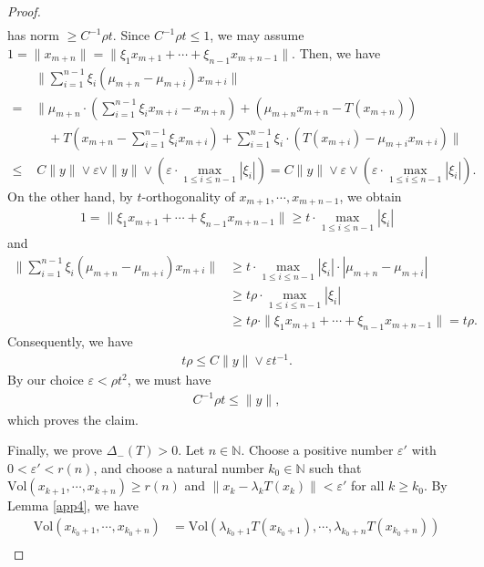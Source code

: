 \documentclass[12pt]{amsart}
\theoremstyle{plain}
\theoremstyle{definition}
\begin{document}
\begin{proof}
\begin{align*}
  \end{align*}
has norm $\ge C^{-1} \rho t$. Since $C^{-1} \rho t \le 1$, we may assume $1 = \|x_{m+n}\| = \|\xi_1 x_{m+1} + \cdots + \xi_{n-1}x_{m+n-1}\|$. Then, we have
\begin{align*}
  & \|\sum_{i=1}^{n-1}\xi_i(\mu_{m+n} - \mu_{m+i})x_{m+i}\| \\
  = \, & \|\mu_{m+n} \cdot (\sum_{i=1}^{n-1}\xi_ix_{m+i} - x_{m+n}) + (\mu_{m+n}x_{m+n} - T(x_{m+n}))  \\ 
  & \quad + T(x_{m+n} - \sum_{i=1}^{n-1}\xi_i x_{m+i}) + \sum_{i=1}^{n-1}\xi_i \cdot (T(x_{m+i}) - \mu_{m+i}x_{m+i})\| \\
  \le & \, C\|y\| \lor \varepsilon \lor \|y\| \lor (\varepsilon \cdot \max_{1\le i \le n-1} |\xi_i|) = C \|y\| \lor \varepsilon \lor (\varepsilon \cdot \max_{1\le i \le n-1} |\xi_i|).
\end{align*}
On the other hand, by $t$-orthogonality of $x_{m+1}, \cdots, x_{m+n-1}$, we obtain
  \begin{align*}
    1 = \|\xi_1 x_{m+1} + \cdots + \xi_{n-1}x_{m+n-1}\| \ge t \cdot \max_{1\le i \le n-1} |\xi_i|
  \end{align*}
  and
\begin{align*}
  \|\sum_{i=1}^{n-1}\xi_i(\mu_{m+n} - \mu_{m+i})x_{m+i}\| &\ge t \cdot \max_{1\le i \le n-1} |\xi_i| \cdot |\mu_{m+n} - \mu_{m+i}| \\
  & \ge t \rho \cdot  \max_{1\le i \le n-1} |\xi_i| \\
  &\ge t \rho \cdot \|\xi_1 x_{m+1} + \cdots + \xi_{n-1}x_{m+n-1}\| = t \rho.
\end{align*}
Consequently, we have
  \begin{align*}
    t \rho \le C \|y\| \lor \varepsilon t^{-1}.
  \end{align*}
  By our choice $\varepsilon < \rho t^2$, we must have 
  \begin{align*}
    C^{-1}\rho t \le \|y\|,
  \end{align*}
  which proves the claim. \par
  Finally, we prove $\Delta_{-}(T) > 0$. Let $n \in \mathbb{N}$. Choose a positive number $\varepsilon'$ with $0 < \varepsilon' < r(n)$, and choose a natural number $k_0 \in \mathbb{N}$ such that $\text{Vol}(x_{k+1}, \cdots, x_{k+n}) \ge r(n)$ and $\|x_k - \lambda_k T(x_k)\| < \varepsilon'$ for all $k \ge k_0$. By Lemma \ref{app4}, we have
  \begin{align*}
    \text{Vol}(x_{k_0+1}, \cdots, x_{k_0+n}) &= \text{Vol}(\lambda_{k_0 +1}T(x_{k_0+1}), \cdots, \lambda_{k_0 + n}T(x_{k_0+n})) \\

\end{align*}
\end{proof}
\end{document}
